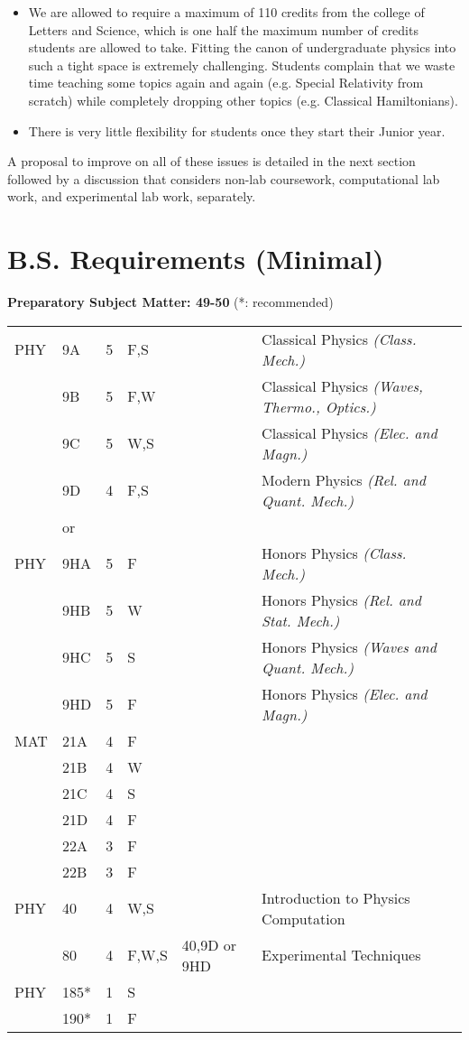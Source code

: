 \documentclass[12pt]{article}
\begin{document}
\begin{itemize}
\item We are allowed to require a maximum of 110 credits from the college of Letters and Science, which is one half the maximum number of credits students are allowed to take.  Fitting the canon of undergraduate physics into such a tight space is extremely challenging.  Students complain that we waste time teaching some topics again and again (e.g. Special Relativity from scratch) while completely dropping other topics (e.g. Classical Hamiltonians).

\item There is very little flexibility for students once they start their Junior year.

\end{itemize}

A proposal to improve on all of these issues is detailed in the next section followed by a discussion that considers non-lab coursework, computational lab work, and experimental lab work, separately.
\newpage

\section{B.S. Requirements (Minimal)}

\noindent
{\bf Preparatory Subject Matter: 49-50} (*: recommended)\\ \vskip -0.25cm

\noindent
\begin{tabular}{|llllll|}
\hline
PHY & 9A & 5 & F,S & & Classical Physics {\it (Class. Mech.)}\\ 
    & 9B & 5 & F,W & & Classical Physics {\it (Waves, Thermo., Optics.)}\\ 
    & 9C & 5 & W,S & & Classical Physics {\it (Elec. and Magn.)}\\ 
    & 9D & 4 & F,S & & Modern Physics {\it (Rel. and Quant. Mech.)}\\ 
\hline
&or&&\\
\hline
PHY & 9HA & 5 & F & & Honors Physics {\it (Class. Mech.)}\\ 
    & 9HB & 5 & W & & Honors Physics {\it (Rel. and Stat. Mech.)}\\ 
    & 9HC & 5 & S & & Honors Physics {\it (Waves and Quant. Mech.)}\\ 
    & 9HD & 5 & F & & Honors Physics {\it (Elec. and Magn.)}\\ 
\hline
\hline
MAT & 21A & 4 & F & &\\ 
    & 21B & 4 & W & &\\ 
    & 21C & 4 & S & &\\ 
    & 21D & 4 & F & &\\ 
    & 22A & 3 & F & &\\ 
    & 22B & 3 & F & &\\ 
PHY & 40  & 4 & W,S & & Introduction to Physics Computation \\ 
    & 80  & 4 & F,W,S & 40,9D or 9HD & Experimental Techniques \\ 
PHY & 185* & 1 & S & & \\ 
    & 190* & 1 & F & & \\ 
\hline
\end{tabular}
\end{document}
